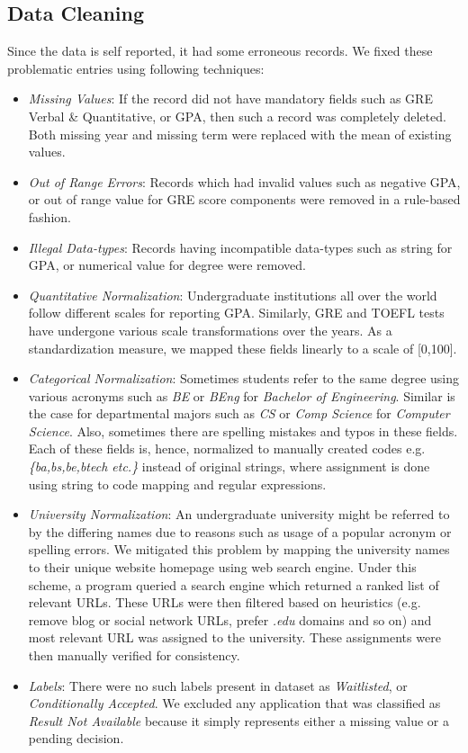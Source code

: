 \documentclass{sig-alternate-05-2015}
\begin{document}
\subsection{Data Cleaning}
\label{subsec:dataset-cleaning}
Since the data is self reported, it had some erroneous records. We fixed these problematic entries using following techniques:
\begin{itemize}
\item \textit{Missing Values}: If the record did not have mandatory fields such as GRE Verbal \& Quantitative, or GPA, then such a record was completely deleted. Both missing year and missing term were replaced with the mean of existing values.
\item \textit{Out of Range Errors}: Records which had invalid values such as negative GPA, or out of range value for GRE score components were removed in a rule-based fashion.
\item \textit{Illegal Data-types}: Records having incompatible data-types such as string for GPA, or numerical value for degree were removed.
\item \textit{Quantitative Normalization}: Undergraduate institutions all over the world follow different scales for reporting GPA. Similarly, GRE and TOEFL tests have undergone various scale transformations over the years. As a standardization measure, we mapped these fields linearly to a scale of [0,100].
\item \textit{Categorical Normalization}: Sometimes students refer to the same degree using various acronyms such as \textit{BE} or \textit{BEng} for \textit{Bachelor of Engineering}. Similar is the case for departmental majors such as \textit{CS} or \textit{Comp Science} for \textit{Computer Science}. Also, sometimes there are spelling mistakes and typos in these fields. Each of these fields is, hence, normalized to manually created codes e.g. \textit{\{ba,bs,be,btech etc.\}} instead of original strings, where assignment is done using string to code mapping and regular expressions.
\item \textit{University Normalization}: An undergraduate university might be referred to by the differing names due to reasons such as usage of a popular acronym or spelling errors. We mitigated this problem by mapping the university names to their unique website homepage using web search engine. Under this scheme, a program queried a search engine which returned a ranked list of relevant URLs. These URLs were then filtered based on heuristics (e.g. remove blog or social network URLs, prefer \textit{.edu} domains and so on) and most relevant URL was assigned to the university. These assignments were then manually verified for consistency.
\item \textit{Labels}: There were no such labels present in dataset as \textit{Waitlisted}, or \textit{Conditionally Accepted}. We excluded any application that was classified as \textit{Result Not Available} because it simply represents either a missing value or a pending decision.
\end{itemize}
\end{document}

